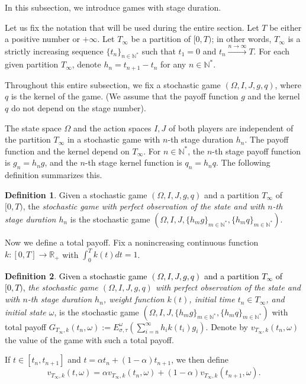 \documentclass[english,openary,12pt]{article}
\newcommand{\red}[1]{\textcolor{black}{#1}}
\theoremstyle{definition}
\newtheorem{definition}{Definition}
\newcommand{\R}{\mathbb{R}}
\newcommand{\N}{\mathbb{N}}
\begin{document}
In this subsection, we introduce games with stage duration. 

Let us fix the notation that will be used during the entire section. Let $T$ be either a positive number or $+\infty$. Let $T_\infty$ be a partition of $[0,T)$; in other words, $T_\infty$ is a strictly increasing sequence $\{t_n\}_{n\in\N^*}$ such that $t_1 = 0$ and $t_n \xrightarrow{n \to \infty} T$. For each given partition $T_\infty$, denote $h_n = t_{n+1}-t_n$ for any $n \in \N^*$.

Throughout this entire subsection, we fix a stochastic game $(\Omega, I, J, g, q)$, where $q$ is the kernel of the game. (We assume that the payoff function $g$ and the kernel $q$ do not depend on the stage number).

The state space $\Omega$ and the action spaces $I, J$ of both players are independent of the partition $T_\infty$ in a stochastic game with $n$-th stage duration $h_n$. The payoff function and the kernel depend on $T_\infty$. For $n \in \N^*$, the $n$-th stage payoff function is $g_n = h_n g$, and the $n$-th stage kernel function is $q_n = h_n q$. The following definition summarizes this.
\begin{definition}
Given a stochastic game $(\Omega, I, J, g, q)$ and a partition $T_\infty$ of $[0,T)$, the \emph{stochastic game with perfect observation of the state and with $n$-th stage duration $h_n$} is the stochastic game
$(\Omega, I, J, \{h_m g\}_{m\in\N^*}, \{h_m q\}_{m\in\N^*}).$
\end{definition}

Now we define a total payoff. Fix a nonincreasing continuous function $k : [0,T] \to \R_+$ with $\int_{0}^T k(t) dt = 1$.

\begin{definition}%
\label{ty3ee}
\red{Given a stochastic game $(\Omega, I, J, g, q)$ and a partition $T_\infty$ of $[0,T)$,} \emph{the stochastic game 
$(\Omega, I, J, g, q)$
with perfect observation of the state and 
with $n$-th stage duration $h_n$, weight function 
$k(t)$, initial time $t_n \in T_\infty$, and initial state $\omega$}, 
is the stochastic game 
$(\Omega, I, J, \{h_m g\}_{m\in\N^*}, \{h_m q\}_{m\in\N^*})$
with total payoff
$G_{T_\infty,k}(t_n,\omega) := E_{\sigma,\tau}^{\omega}
\left( \sum\limits_{i = n}^\infty h_i k(t_i) g_i \right).$
Denote by $v_{T_\infty,k}(t_n,\omega)$ the value of the game with such a 
total payoff.

If $t \in [t_n,t_{n+1}]$ and 
$t = \alpha t_n + (1-\alpha) t_{n+1}$, we then define
$$v_{T_\infty,k}(t,\omega) = 
\alpha v_{T_\infty,k}(t_n,\omega) + 
(1-\alpha) v_{T_\infty,k}(t_{n+1},\omega).$$
\end{definition}
\end{document}
